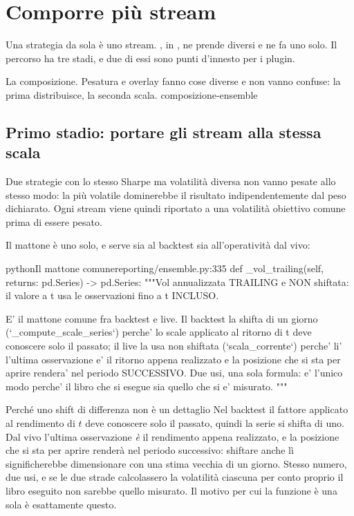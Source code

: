 \section{Comporre più stream}\label{sez:ensemble}

Una strategia da sola è uno stream. , in
, ne prende diversi e ne fa uno solo. Il percorso
ha tre stadi, e due di essi sono punti d'innesto per i plugin.

  {La composizione. Pesatura e overlay fanno cose diverse e non vanno
   confuse: la prima distribuisce, la seconda scala.}
  {composizione-ensemble}

\subsection{Primo stadio: portare gli stream alla stessa scala}

Due strategie con lo stesso Sharpe ma volatilità diversa non vanno pesate
allo stesso modo: la più volatile dominerebbe il risultato
indipendentemente dal peso dichiarato. Ogni stream viene quindi riportato a
una volatilità obiettivo comune prima di essere pesato.

Il mattone è uno solo, e serve sia al backtest sia all'operatività dal vivo:

\begin{codiceInterno}{python}{Il mattone comune}{reporting/ensemble.py:335}
    def _vol_trailing(self, returns: pd.Series) -> pd.Series:
        """Vol annualizzata TRAILING e NON shiftata: il valore a t usa le
        osservazioni fino a t INCLUSO.

        E' il mattone comune fra backtest e live. Il backtest la shifta di un
        giorno (`_compute_scale_series`) perche' lo scale applicato al ritorno
        di t deve conoscere solo il passato; il live la usa non shiftata
        (`scala_corrente`) perche' li' l'ultima osservazione e' il ritorno
        appena realizzato e la posizione che si sta per aprire rendera' nel
        periodo SUCCESSIVO. Due usi, una sola formula: e' l'unico modo perche'
        il libro che si esegue sia quello che si e' misurato.
        """
\end{codiceInterno}

\begin{perche}{Perché uno shift di differenza non è un dettaglio}
Nel backtest il fattore applicato al rendimento di $t$ deve conoscere solo il
passato, quindi la serie si shifta di uno. Dal vivo l'ultima osservazione
\emph{è} il rendimento appena realizzato, e la posizione che si sta per
aprire renderà nel periodo successivo: shiftare anche lì significherebbe
dimensionare con una stima vecchia di un giorno. Stesso numero, due usi, e
se le due strade calcolassero la volatilità ciascuna per conto proprio il
libro eseguito non sarebbe quello misurato. Il motivo per cui la funzione è
una sola è esattamente questo.
\end{perche}


